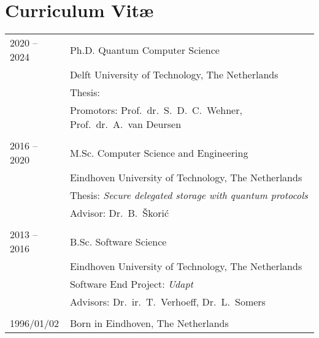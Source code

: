 \chapter*{Curriculum Vit\ae}

\makeatletter
\authors{\@firstname\ {\titleshape\@lastname}}
\def\thesistitle{\@title}
\makeatother

\newlength{\tabcolsepold}
\setlength{\tabcolsepold}{\tabcolsep}
\setlength{\tabcolsep}{0cm}

\noindent
\begin{tabularx}{\linewidth}{p{2cm}X}
    2020 -- 2024 & Ph.D. Quantum Computer Science \\
                 & Delft University of Technology, The Netherlands \\
                 & Thesis: \emph{\thesistitle} \\
                 & Promotors: Prof.\ dr.\ S.\ D.\ C.\ Wehner, Prof.\ dr.\ A.\ van Deursen \\
    \\
    2016 -- 2020 & M.Sc. Computer Science and Engineering \\
                 & Eindhoven University of Technology, The Netherlands \\
                 & Thesis: \emph{Secure delegated storage with quantum protocols} \\
                 & Advisor: Dr.\ B.\ Škorić \\
    \\
    2013 -- 2016 & B.Sc. Software Science \\
                 & Eindhoven University of Technology, The Netherlands \\
                 & Software End Project: \emph{Udapt} \\
                 & Advisors: Dr.\ ir.\ T.\ Verhoeff, Dr.\ L.\ Somers \\
    \\
    1996/01/02   & Born in Eindhoven, The Netherlands \\
\end{tabularx}

\setlength{\tabcolsep}{\tabcolsepold}
